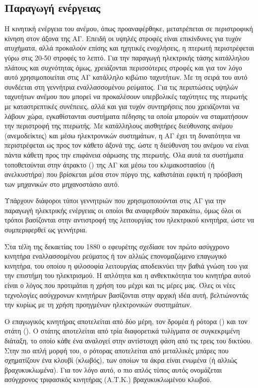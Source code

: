 \documentclass[12pt]{report}
\begin{document}
\subsection{Παραγωγή ενέργειας}
Η κινητική ενέργεια του ανέμου, όπως προαναφέρθηκε, μετατρέπεται σε περιστροφική κίνηση στον άξονα της ΑΓ. Επειδή οι υψηλές στροφές είναι επικίνδυνες για τυχόν ατυχήματα, αλλά προκαλούν επίσης και ηχητικές ενοχλήσεις, η πτερωτή 
περιστρέφεται γύρω στις 20-50 στροφές το λεπτό. Για την παραγωγή ηλεκτρικής τάσης κατάλληλου πλάτους και συχνότητας όμως, χρειάζονται περισσότερες στροφές και για τον λόγο αυτό χρησιμοποιείται στις ΑΓ κατάλληλο κιβώτιο ταχυτήτων. 
Με τη σειρά του αυτό συνδέεται στη γεννήτρια εναλλασσομένου ρεύματος. Για τις περιπτώσεις υψηλών ταχυτήτων ανέμου που μπορεί να προκαλέσουν υπερβολικές ταχύτητες της πτερωτής με καταστρεπτικές συνέπειες, αλλά και για τυχόν 
συντηρήσεις που χρειάζονται να λάβουν χώρα, εγκαθίστανται συστήματα πέδησης τα οποία μπορούν να σταματήσουν την περιστροφή της πτερωτής. Με κατάλληλους αισθητήρες διεύθυνσης ανέμου (ανεμοδείκτες) και μέσω ηλεκτρονικών συστημάτων, 
η ΑΓ έχει τη δυνατότητα να περιστρέφεται ως προς τον κάθετο άξονά της, ώστε η διεύθυνση του ανέμου να είναι πάντα κάθετη προς την επιφάνεια σάρωσης της πτερωτής. Όλα αυτά τα συστήματα τοποθετούνται στην άτρακτο 
({}) της ΑΓ και μέσω του κλιμακοστασίου (ή ανελκυστήρα) που βρίσκεται μέσα στον πύργο της, καθιστάται εφικτή η πρόσβαση των μηχανικών στο μηχανοστάσιο αυτό.

Υπάρχουν διάφοροι τύποι γεννητριών που χρησιμοποιούνται στις ΑΓ για την παραγωγή ηλεκτρικής ενέργειας οι οποίοι θα αναφερθούν παρακάτω, όμως όλοι οι τρόποι βασίζονται στην αντιστροφή της λειτουργίας του ηλεκτρικού κινητήρα, 
ώστε να συμπεριφερθεί ως γεννήτρια. 

Στα τέλη της δεκαετίας του 1880 ο εφευρέτης {} σχεδίασε τον πρώτο ασύγχρονο κινητήρα εναλλασσομένου ρεύματος ή τον αλλιώς επονομαζώμενο επαγωγικό κινητήρα, του οποίου η φιλοσοφία λειτουργίας αποδεικνύει την
βαθιά γνώση του {} για την επιστήμη του ηλεκτρισμού. 
Η απλότητα και η ανθεκτικότητα του κινητήρα αυτού είναι ο λόγος που προτιμάται η χρήση του μέχρι και τις μέρες μας. 
Όλες οι νέες τεχνολογίες ασύγχρονων κινητήρων βασίζονται στην αρχική ιδέα αυτή, βελτιώνοντάς την κυρίως με τη χρήση προηγμένων ηλεκτρονικών συστημάτων.

Ο επαγωγικός κινητήρας αποτελείται από δύο μέρη, τον δρομέα ή ρότορα ({}) και τον στάτη ({}). Ο στάτης αποτελείται από τρία διαφορετικά τυλίγματα σε συγκεκριμένη διάταξη, το οποίο κάθε 
ένα αναλογεί στην αντίστοιχη φάση από τις τρεις του δικτύου. Στην πιο απλή μορφή του, ο ρότορας αποτελείται από μεταλλικές μπάρες που σχηματίζουν ένα κλουβί (κλωβός), των οποίων τα άκρα είναι ενωμένα (ή αλλιώς βραχυκυκλωμένα). 
Για τον λόγο αυτό, ο πιο απλός τύπος αυτός ονομάζεται ασύγχρονος τριφασικός κινητήρας (Α.Τ.Κ.) βραχυκυκλωμένου κλωβού. 
\end{document}
